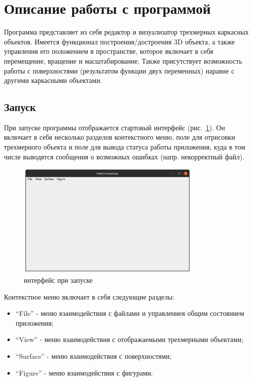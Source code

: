 \documentclass[12pt, a4paper, hidelinks]{article}
\begin{document}
\section{Описание работы с программой}
Программа представляет из себя редактор и визуализатор трехмерных каркасных объектов. Имеется функционал построения/достроения 3D объекта, а также управления его положением в пространстве, которое включает в себя перемещение, вращение и масштабирование. Также присутствует возможность работы с поверхностями (результатом функции двух переменных) наравне с другими каркасными объектами.

\subsection{Запуск}
При запуске программы отображается стартовый интерфейс (рис.~\ref{start_interface}). Он включает в себя несколько разделов контекстного меню, поле для отрисовки трехмерного объекта и поле для вывода статуса работы приложения, куда в том числе выводятся сообщения о возможных ошибках (напр. некорректный файл).

\begin{figure}[htbp!]
	\centering
	\includegraphics[width=0.8\textwidth]{images/start.png}
	\caption{интерфейс при запуске}
	\label{start_interface}
\end{figure}

\noindent Контекстное меню включает в себя следующие разделы:
\begin{itemize}
    \item \enquote{File} - меню взаимодействия с файлами и управлениея общим состоянием приложения;
    \item \enquote{View} - меню взаимодействия с отображаемыми трехмерными объектами;
    \item \enquote{Surface} - меню взаимодействия с поверхностями;
    \item \enquote{Figure} - меню взаимодействия с фигурами.
\end{itemize}
\end{document}
